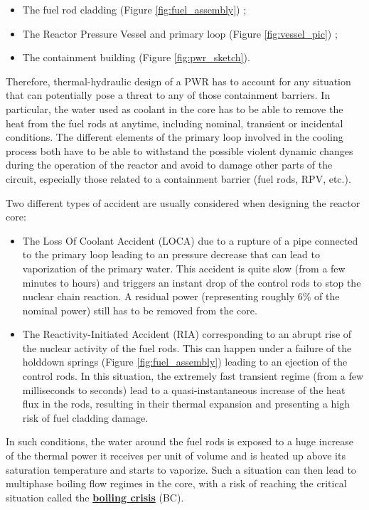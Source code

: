 \begin{itemize}
\item The fuel rod cladding (Figure \ref{fig:fuel_assembly}) ;
\item The Reactor Pressure Vessel and primary loop (Figure \ref{fig:vessel_pic}) ;
\item The containment building (Figure \ref{fig:pwr_sketch}).
\end{itemize}


Therefore, thermal-hydraulic design of a PWR has to account for any situation that can potentially pose a threat to any of those containment barriers. In particular, the water used as coolant in the core has to be able to remove the heat from the fuel rods at anytime, including nominal, transient or incidental conditions. The different elements of the primary loop involved in the cooling process both have to be able to withstand the possible violent dynamic changes during the operation of the reactor and avoid to damage other parts of the circuit, especially those related to a containment barrier (fuel rods, RPV, etc.).


\npar

Two different types of accident are usually considered when designing the reactor core:

\begin{itemize}
\item The Loss Of Coolant Accident (LOCA) due to a rupture of a pipe connected to the primary loop leading to an pressure decrease that can lead to vaporization of the primary water. This accident is quite slow (from a few minutes to hours) and triggers an instant drop of the control rods to stop the nuclear chain reaction. A residual power (representing roughly 6\% of the nominal power) still has to be removed from the core.

\item The Reactivity-Initiated Accident (RIA) corresponding to an abrupt rise of the nuclear activity of the fuel rods. This can happen under a failure of the holddown springs (Figure \ref{fig:fuel_assembly}) leading to an ejection of the control rods. In this situation, the extremely fast transient regime (from a few milliseconds to seconds) lead to a quasi-instantaneous increase of the heat flux in the rods, resulting in their thermal expansion and presenting a high risk of fuel cladding damage. 
\end{itemize}


In such conditions, the water around the fuel rods is exposed to a huge increase of the thermal power it receives per unit of volume and is heated up above its saturation temperature and starts to vaporize. Such a situation can then lead to multiphase boiling flow regimes in the core, with a risk of reaching the critical situation called the \textbf{\underline{boiling crisis}} (BC).

